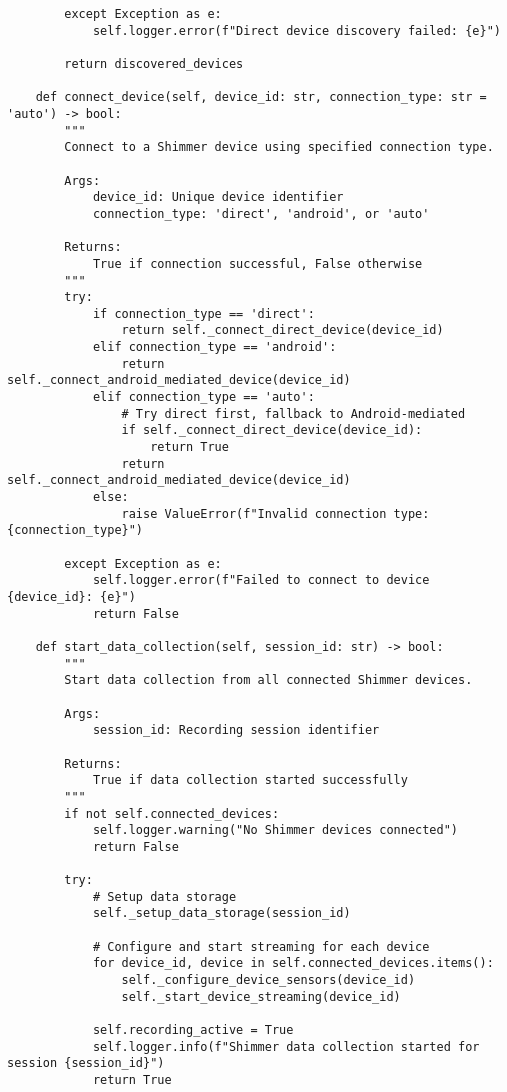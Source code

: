\documentclass[12pt,a4paper]{article}
\begin{document}
\begin{verbatim}
        except Exception as e:
            self.logger.error(f"Direct device discovery failed: {e}")
            
        return discovered_devices
    
    def connect_device(self, device_id: str, connection_type: str = 'auto') -> bool:
        """
        Connect to a Shimmer device using specified connection type.
        
        Args:
            device_id: Unique device identifier
            connection_type: 'direct', 'android', or 'auto'
            
        Returns:
            True if connection successful, False otherwise
        """
        try:
            if connection_type == 'direct':
                return self._connect_direct_device(device_id)
            elif connection_type == 'android':
                return self._connect_android_mediated_device(device_id)
            elif connection_type == 'auto':
                # Try direct first, fallback to Android-mediated
                if self._connect_direct_device(device_id):
                    return True
                return self._connect_android_mediated_device(device_id)
            else:
                raise ValueError(f"Invalid connection type: {connection_type}")
                
        except Exception as e:
            self.logger.error(f"Failed to connect to device {device_id}: {e}")
            return False
    
    def start_data_collection(self, session_id: str) -> bool:
        """
        Start data collection from all connected Shimmer devices.
        
        Args:
            session_id: Recording session identifier
            
        Returns:
            True if data collection started successfully
        """
        if not self.connected_devices:
            self.logger.warning("No Shimmer devices connected")
            return False
        
        try:
            # Setup data storage
            self._setup_data_storage(session_id)
            
            # Configure and start streaming for each device
            for device_id, device in self.connected_devices.items():
                self._configure_device_sensors(device_id)
                self._start_device_streaming(device_id)
            
            self.recording_active = True
            self.logger.info(f"Shimmer data collection started for session {session_id}")
            return True
            

\end{verbatim}
\end{document}

